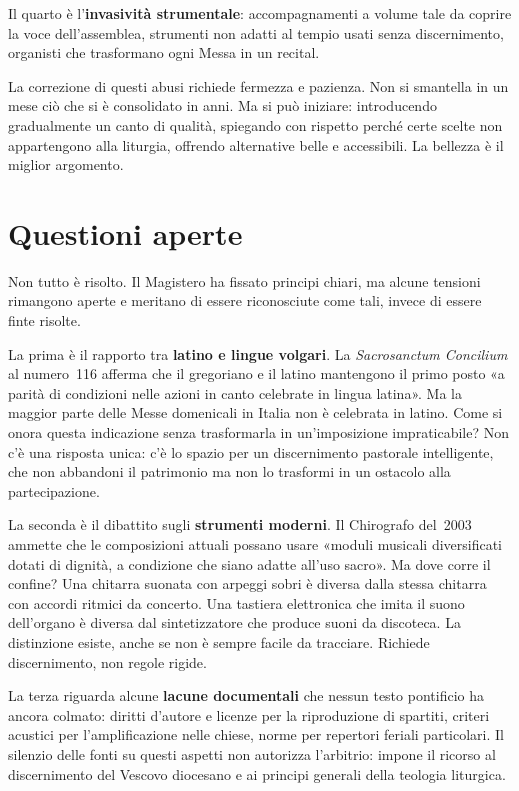 \documentclass[12pt,a4paper]{article}
\begin{document}
	Il quarto è l'\textbf{invasività strumentale}: accompagnamenti a volume tale da
	coprire la voce dell'assemblea, strumenti non adatti al tempio usati senza
	discernimento, organisti che trasformano ogni Messa in un recital.
	
	La correzione di questi abusi richiede fermezza e pazienza. Non si smantella in
	un mese ciò che si è consolidato in anni. Ma si può iniziare: introducendo
	gradualmente un canto di qualità, spiegando con rispetto perché certe scelte non
	appartengono alla liturgia, offrendo alternative belle e accessibili. La bellezza
	è il miglior argomento.
	
	\section{Questioni aperte}
	
	Non tutto è risolto. Il Magistero ha fissato principi chiari, ma alcune tensioni
	rimangono aperte e meritano di essere riconosciute come tali, invece di essere
	finte risolte.
	
	La prima è il rapporto tra \textbf{latino e lingue volgari}. La
	\emph{Sacrosanctum Concilium} al numero~116 afferma che il gregoriano e il latino
	mantengono il primo posto «a parità di condizioni nelle azioni in canto celebrate
	in lingua latina». Ma la maggior parte delle Messe domenicali in Italia non è
	celebrata in latino. Come si onora questa indicazione senza trasformarla in
	un'imposizione impraticabile? Non c'è una risposta unica: c'è lo spazio per un
	discernimento pastorale intelligente, che non abbandoni il patrimonio ma non lo
	trasformi in un ostacolo alla partecipazione.
	
	La seconda è il dibattito sugli \textbf{strumenti moderni}. Il Chirografo
	del~2003 ammette che le composizioni attuali possano usare «moduli musicali
	diversificati dotati di dignità, a condizione che siano adatte all'uso sacro».
	Ma dove corre il confine? Una chitarra suonata con arpeggi sobri è diversa dalla
	stessa chitarra con accordi ritmici da concerto. Una tastiera elettronica che
	imita il suono dell'organo è diversa dal sintetizzatore che produce suoni da
	discoteca. La distinzione esiste, anche se non è sempre facile da tracciare.
	Richiede discernimento, non regole rigide.
	
	La terza riguarda alcune \textbf{lacune documentali} che nessun testo pontificio
	ha ancora colmato: diritti d'autore e licenze per la riproduzione di spartiti,
	criteri acustici per l'amplificazione nelle chiese, norme per repertori feriali
	particolari. Il silenzio delle fonti su questi aspetti non autorizza l'arbitrio:
	impone il ricorso al discernimento del Vescovo diocesano e ai principi generali
	della teologia liturgica.
	
\end{document}
